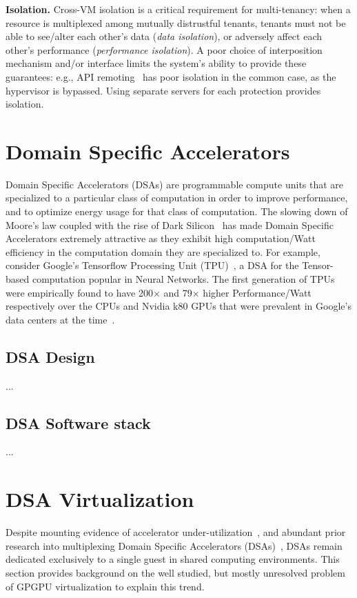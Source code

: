 \textbf{Isolation.}
Cross-VM isolation is a critical requirement for multi-tenancy:
when a resource is multiplexed among mutually distrustful tenants, tenants
must not be able to see/alter each other's data (\emph{data isolation}),
or adversely affect each other's performance (\emph{performance isolation}).
A poor choice of interposition mechanism and/or interface limits the system's
ability to provide these guarantees:
e.g., API remoting~\cite{bitfusion, rCUDA, mps} has poor isolation in the
common case, as the hypervisor is bypassed. Using separate servers for each
protection provides isolation.

\section{Domain Specific Accelerators}
Domain Specific Accelerators (DSAs) are programmable compute units that are
specialized to a particular class of computation in order to improve
performance, and to optimize energy usage for that class of computation.
The slowing down of Moore's law coupled with the rise of Dark Silicon~\cite{
Esmaeilzadeh2011-qv} has made Domain Specific Accelerators extremely attractive
as they exhibit high computation/Watt efficiency in the computation domain
they are specialized to. For example, consider Google's Tensorflow Processing
Unit (TPU)~\cite{TPU-CACM}, a DSA for the Tensor-based computation popular in
Neural Networks.
The first generation of TPUs were empirically found to have 200$\times$ and
79$\times$ higher Performance/Watt respectively over the CPUs and Nvidia k80
GPUs that were prevalent in Google's data centers at the time~\cite{TPU-ISCA}.

\subsection{DSA Design}
...

\subsection{DSA Software stack}
...

\section{DSA Virtualization}

Despite mounting evidence of accelerator under-utilization~\cite{
underutilizingcloud, simultaneous_multikernel,improving_gpu,gpl,fiddle},
and abundant prior research into multiplexing Domain Specific Accelerators
(DSAs)~\cite{gpl,fiddle,zhang2018g, simultaneous_multikernel,improving_gpu,
yeh2017pagoda}, DSAs remain dedicated exclusively to a single guest in shared
computing environments. This section provides background on the well studied,
but mostly unresolved problem of GPGPU virtualization to explain this trend.

